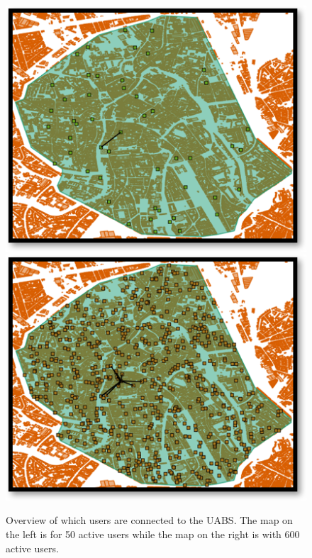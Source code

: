 \begin{figure}[!htb]
  \includegraphics[width=\linewidth]{../images/connectionsMap50Users.png}
\endminipage\hfill
{}%
  \includegraphics[width=\linewidth]{../images/connectionsMap600Users.png}
\endminipage
  \caption{Overview of which users are connected to the \gls{UABS}. The map on the left is for 50 active users while the map on the right is with 600 active users.}
  \label{fig:connectionMap}
\end{figure}
